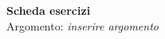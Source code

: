 \documentclass[11pt,a4paper]{article}
\begin{document}
\begin{center}
  {\Large \textbf{Scheda esercizi}}\\
  Argomento: \textit{inserire argomento}
\end{center}

\end{document}
